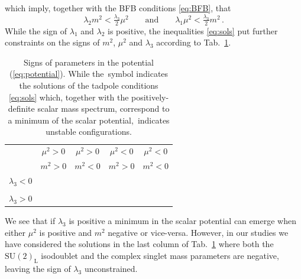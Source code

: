 \documentclass[a4paper,11pt]{article}
\renewcommand{\[}{\left[}
\renewcommand{\]}{\right]}
\newcommand{\SU}[2]{\mathrm{SU}(#1)_{\mathrm{#2}}}		%
\newcommand{\xmark}{\ding{55}}%
\begin{document}
which imply, together with the BFB conditions \eqref{eq:BFB}, that
%
\begin{equation}
\lambda_2 m^2 < \tfrac{\lambda_3}{2} \mu^2 
\qquad
\text{and}
\qquad
\lambda_1 \mu^2 < \tfrac{\lambda_3}{2} m^2 \,.
\label{eq:sols}
\end{equation}
While the sign of $\lambda_1$ and $\lambda_2$ is positive, the inequalities \eqref{eq:sols} put further constraints on the signs of $m^2$, $\mu^2$ and $\lambda_3$ according to Tab.~\ref{tab:signs}.
%
\begin{table}[htb!]
	\begin{center}
		\begin{tabular}{ccccc}
			\toprule                     
			& $\mu^2 > 0$ & $\mu^2 > 0$ & $\mu^2 < 0$ & $\mu^2 < 0$  	\\
			& $m^2 > 0$ & $m^2 < 0$ & $m^2 > 0$ & $m^2 < 0$  	\\        
			\midrule
			$\lambda_3 < 0 $     			    							& \xmark		& \checkmark	&	\checkmark & \checkmark	\\
			& 		& 	&	 & 	\\
			$\lambda_3 > 0$     			    							& \xmark		& \xmark	&	\xmark &  \checkmark \\
			\bottomrule
		\end{tabular} 
		\caption{Signs of parameters in the potential (\ref{eq:potential}).
While the \checkmark\,symbol indicates the solutions of the tadpole conditions \eqref{eq:sols} which, together with the positively-definite scalar mass spectrum, correspond to a minimum of the scalar potential, \xmark\,indicates unstable configurations.}
		\label{tab:signs}  
	\end{center}
\end{table} 
%
We see that if $\lambda_3$ is positive a minimum in the scalar potential can emerge when either $\mu^2$ is positive and $m^2$ negative or vice-versa. However, in our studies we have considered the solutions in the last column of Tab.~\ref{tab:signs} where both the $\SU{2}{L}$ isodoublet and the complex singlet mass parameters are negative, leaving the sign of $\lambda_3$ unconstrained.
\end{document}
